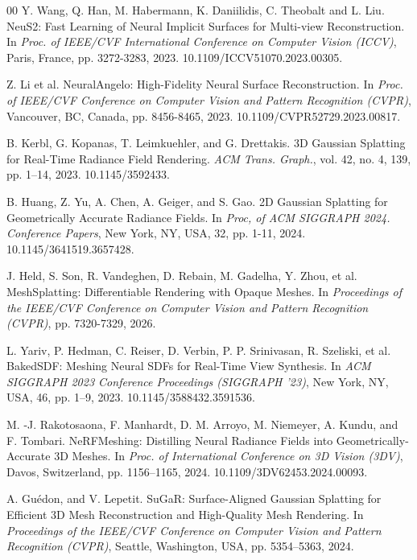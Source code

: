 \documentclass{ieeeaccess}
\begin{document}
\begin{thebibliography}{00}
Y. Wang, Q. Han, M. Habermann, K. Daniilidis, C. Theobalt and L. Liu. NeuS2: Fast Learning of Neural Implicit Surfaces for Multi-view Reconstruction. In \textit{Proc. of IEEE/CVF International Conference on Computer Vision (ICCV)}, Paris, France, pp. 3272-3283, 2023. 10.1109/ICCV51070.2023.00305.


Z. Li et al. NeuralAngelo: High-Fidelity Neural Surface Reconstruction. In \textit{Proc. of IEEE/CVF Conference on Computer Vision and Pattern Recognition (CVPR)}, Vancouver, BC, Canada, pp. 8456-8465, 2023. 10.1109/CVPR52729.2023.00817.

B. Kerbl, G. Kopanas, T. Leimkuehler, and G. Drettakis. 3D Gaussian Splatting for Real-Time Radiance Field Rendering. \textit{ACM Trans. Graph.}, vol. 42, no. 4, 139, pp. 1--14, 2023. 10.1145/3592433.

B. Huang, Z. Yu, A. Chen, A. Geiger, and S. Gao. 2D Gaussian Splatting for Geometrically Accurate Radiance Fields. In \textit{Proc, of ACM SIGGRAPH 2024. Conference Papers}, New York, NY, USA, 32, pp. 1-11, 2024. 10.1145/3641519.3657428.

J. Held, S. Son, R. Vandeghen, D. Rebain, M. Gadelha, Y. Zhou, et al. MeshSplatting: Differentiable Rendering with Opaque Meshes. In \textit{Proceedings of the IEEE/CVF Conference on Computer Vision and Pattern Recognition (CVPR)}, pp. 7320-7329, 2026.

L. Yariv, P. Hedman, C. Reiser, D. Verbin, P. P. Srinivasan, R. Szeliski, et al. BakedSDF: Meshing Neural SDFs for Real-Time View Synthesis. In \textit{ACM SIGGRAPH 2023 Conference Proceedings (SIGGRAPH '23)}, New York, NY, USA, 46, pp. 1--9, 2023. 10.1145/3588432.3591536.


M. -J. Rakotosaona, F. Manhardt, D. M. Arroyo, M. Niemeyer, A. Kundu, and F. Tombari. NeRFMeshing: Distilling Neural Radiance Fields into Geometrically-Accurate 3D Meshes. In \textit{Proc. of International Conference on 3D Vision (3DV)}, Davos, Switzerland, pp. 1156--1165, 2024. 10.1109/3DV62453.2024.00093.

A. Gu\'edon, and V. Lepetit. SuGaR: Surface-Aligned Gaussian Splatting for Efficient 3D Mesh Reconstruction and High-Quality Mesh Rendering. In \textit{Proceedings of the IEEE/CVF Conference on Computer Vision and Pattern Recognition (CVPR)}, Seattle, Washington, USA, pp. 5354--5363, 2024.


\end{thebibliography}
\end{document}
